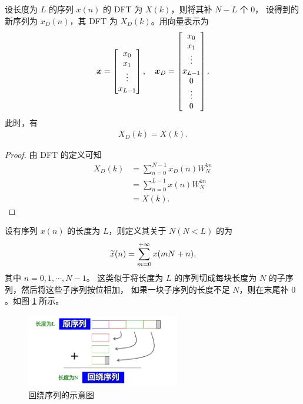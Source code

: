 \begin{theorem}
    设长度为 $L$ 的序列 $x(n)$ 的 DFT 为 $X(k)$，则将其补 $N - L$ 个 $0$，
    设得到的新序列为 $x_D(n)$，其 DFT 为 $X_D(k)$。用向量表示为
    \begin{align*}
        \bm{x} = \begin{bmatrix}
            x_0 \\ x_1 \\ \vdots \\ x_{L - 1}
        \end{bmatrix}, \quad
        \bm{x}_D = \begin{bmatrix}
            x_0 \\ x_1 \\ \vdots \\ x_{L - 1} \\ 0 \\ \vdots \\ 0
        \end{bmatrix}.
    \end{align*}
    此时，有
    \begin{align*}
        X_D(k) = X(k).
    \end{align*}
\end{theorem}
    
\begin{proof}
    由 DFT 的定义可知
    \begin{align*}
        X_D(k) & = \sum_{n = 0}^{N - 1}x_D(n)W_N^{kn} \\
        & = \sum_{n = 0}^{L - 1}x(n)W_N^{kn} \\
        & = X(k).
    \end{align*}
\end{proof}

\begin{definition}[回绕序列]
    设有序列 $x(n)$ 的长度为 $L$，则定义其关于 $N(N < L)$ 的为
    \begin{align*}
        \widetilde{x}(n) = \sum_{m = 0}^{+\infty}x(mN + n),
    \end{align*}
    其中 $n = 0, 1, \cdots, N - 1$。
    这类似于将长度为 $L$ 的序列切成每块长度为 $N$ 的子序列，然后将这些子序列按位相加，
    如果一块子序列的长度不足 $N$，则在末尾补 $0$。如图 \ref{fig:wrapped_sequence} 所示。
    \begin{figure}[H]
        \centering
        \includegraphics[width = 0.6\textwidth]{chap3/img/wrapped_sequence.png}
        \caption{回绕序列的示意图}
        \label{fig:wrapped_sequence}
    \end{figure}
\end{definition}

